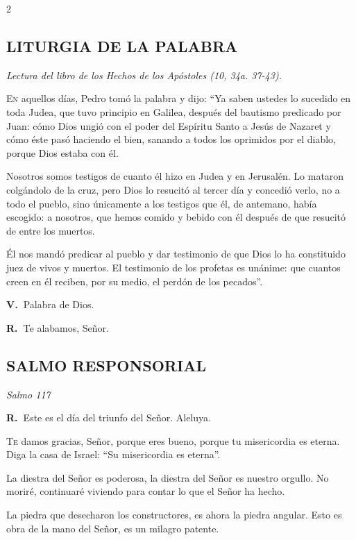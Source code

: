 \documentclass[11pt, letterpaper, twoside]{article}
\newcommand{\rubrica}[1]{\textcolor{rubricred}{\small\textit{#1}}}
\newcommand{\vers}{\textcolor{rubricred}{\textbf{V.\ }}}
\newcommand{\resp}{\textcolor{rubricred}{\textbf{R.\ }}}
\begin{document}
\begin{multicols}{2}
\subsection*{LITURGIA DE LA PALABRA}
\noindent\rubrica{Lectura del libro de los Hechos de los Apóstoles (10, 34a. 37-43).} \par\vspace{0.2cm}
\lettrine{E}{n} aquellos días, Pedro tomó la palabra y dijo: “Ya saben ustedes lo sucedido en toda Judea, que tuvo principio en Galilea, después del bautismo predicado por Juan: cómo Dios ungió con el poder del Espíritu Santo a Jesús de Nazaret y cómo éste pasó haciendo el bien, sanando a todos los oprimidos por el diablo, porque Dios estaba con él.

Nosotros somos testigos de cuanto él hizo en Judea y en Jerusalén. Lo mataron colgándolo de la cruz, pero Dios lo resucitó al tercer día y concedió verlo, no a todo el pueblo, sino únicamente a los testigos que él, de antemano, había escogido: a nosotros, que hemos comido y bebido con él después de que resucitó de entre los muertos.

Él nos mandó predicar al pueblo y dar testimonio de que Dios lo ha constituido juez de vivos y muertos. El testimonio de los profetas es unánime: que cuantos creen en él reciben, por su medio, el perdón de los pecados”. \par\vspace{0.2cm}
\vers Palabra de Dios. \par
\resp Te alabamos, Señor.

\subsection*{SALMO RESPONSORIAL}
\noindent\rubrica{Salmo 117} \par\vspace{0.1cm}
\resp Este es el día del triunfo del Señor. Aleluya. \par\vspace{0.2cm}
\lettrine{T}{e} damos gracias, Señor, porque eres bueno, porque tu misericordia es eterna. Diga la casa de Israel: “Su misericordia es eterna”.

La diestra del Señor es poderosa, la diestra del Señor es nuestro orgullo. No moriré, continuaré viviendo para contar lo que el Señor ha hecho.

La piedra que desecharon los constructores, es ahora la piedra angular. Esto es obra de la mano del Señor, es un milagro patente.


\end{multicols}
\end{document}
